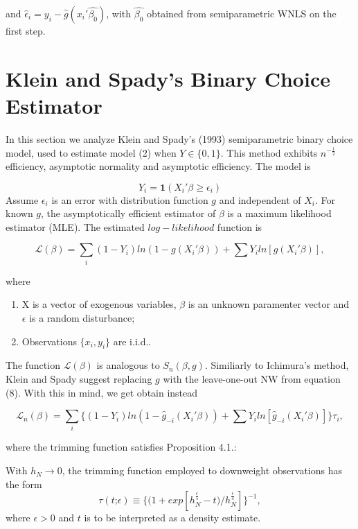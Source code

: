 \documentclass[a4paper]{article}
\begin{document}
and $\hat{\epsilon}_i = y_i - \hat{g}(x_i'\hat{\beta_0})$, with $\hat{\beta_0}$ obtained from semiparametric WNLS on the first step.



\section{Klein and Spady's Binary Choice Estimator} %
\label{sec:section_about_references_within_the_document}
In this section we analyze Klein and Spady's (1993) semiparametric binary choice model, used to estimate model (2) when $Y \in \{0,1\}$.   This method exhibits $n^{-\frac{1}{2}}$ efficiency, asymptotic normality and asymptotic efficiency. The model is

\begin{equation}
Y_i =  \mathbf{1}{(X_i'\beta \geq \epsilon_i)}
\end{equation}
Assume $\epsilon_i$ is an error with distribution function $g$ and independent of $X_i$. For known $g$, the asymptotically efficient estimator of $\beta$ is a maximum likelihood estimator (MLE). The estimated $log-likelihood$ function is

\begin{equation}
\mathcal{L}(\beta) = \sum_i (1 - Y_i)ln( 1 - g(X_i'\beta)) + \sum Y_iln[g(X_i'\beta)],
\end{equation}

where

\begin{enumerate}
		\item X is a vector of exogenous variables, $\beta$ is an unknown paramenter vector and $\epsilon$ is a random disturbance;
		\item Observations $\{x_i,y_i\}$ are i.i.d..
\end{enumerate}

The function $\mathcal{L}(\beta)$ is analogous to $S_n(\beta,g)$. Similiarly to Ichimura's method, Klein and Spady suggest replacing $g$ with the leave-one-out NW from equation (8). With this in mind, we get obtain instead

\begin{equation}
\mathcal{L}_n(\beta) = \sum_i \{ (1 - Y_i)ln( 1 - \hat{g}_{-i}(X_i'\beta)) + \sum Y_iln[\hat{g}_{-i}(X_i'\beta)]\}\tau_{i},
\end{equation}

where the trimming function satisfies Proposition 4.1.:

\newtheorem{proposition}{Proposition}[section]
\begin{prop}
With $h_N \rightarrow 0$, the trimming function employed to downweight observations has the form
\[ \tau(t \text{;}\epsilon) \equiv \{(1 + exp[h_{N}^{\frac{\epsilon}{5}} - t)/h_{N}^{\frac{\epsilon}{4}}]\}^{-1}, \]
where $\epsilon > 0$ and $t$ is to be interpreted as a density estimate.
\end{prop}
\end{document}
